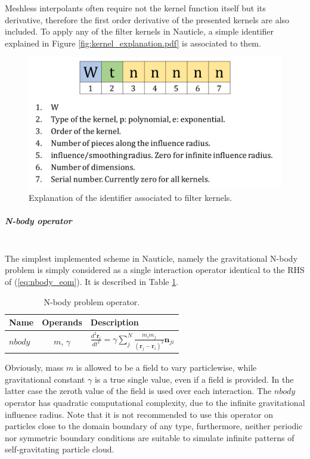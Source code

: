 \documentclass[a4paper,12pt,openany]{book}
\newcommand{\equref}[1]{(\ref{#1})}
\newcommand{\mysubparagraph}[1]{\subparagraph{#1}\mbox{}\\}
\theoremstyle{break}
\begin{document}
Meshless interpolants often require not the kernel function itself but its derivative, therefore the first order derivative of the presented kernels are also included. To apply any of the filter kernels in Nauticle, a simple identifier explained in Figure \ref{fig:kernel_explanation.pdf} is associated to them.
\begin{figure}[H]
  \includegraphics[scale=0.3]{kernel_explanation.pdf}
  \centering
  \caption{Explanation of the identifier associated to filter kernels.}
  \label{fig:kernel_explanation}
\end{figure}

\mysubparagraph{N-body operator}
The simplest implemented scheme in Nauticle, namely the gravitational N-body problem is simply considered as a single interaction operator identical to the RHS of \equref{eq:nbody_eom}. It is described in Table \ref{tbl:nbody_op}.
\begin{table} [hbt!]
\begin{center}
\caption{N-body problem operator.}\label{tbl:nbody_op}
\begin{tabular}{ l c l }
\toprule[1.5pt]
\bf Name & \bf Operands & \bf Description \\ 
\midrule
$nbody$ & $m$, $\gamma$ & $\frac{d^2\textbf{r}_i}{dt^2}=\gamma\sum_j^N{\frac{m_im_j}{(\textbf{r}_j-\textbf{r}_i)^2}\textbf{n}_{ji}}$ \\ 
\bottomrule[1.25pt]
\end{tabular}
\end{center}
\end{table}
Obviously, mass $m$ is allowed to be a field to vary particlewise, while gravitational constant $\gamma$ is a true single value, even if a field is provided. In the latter case the zeroth value of the field is used over each interaction. The $nbody$ operator has quadratic computational complexity, due to the infinite gravitational influence radius. Note that it is not recommended to use this operator on particles close to the domain boundary of any type, furthermore, neither periodic nor symmetric boundary conditions are suitable to simulate infinite patterns of self-gravitating particle cloud.
\end{document}
